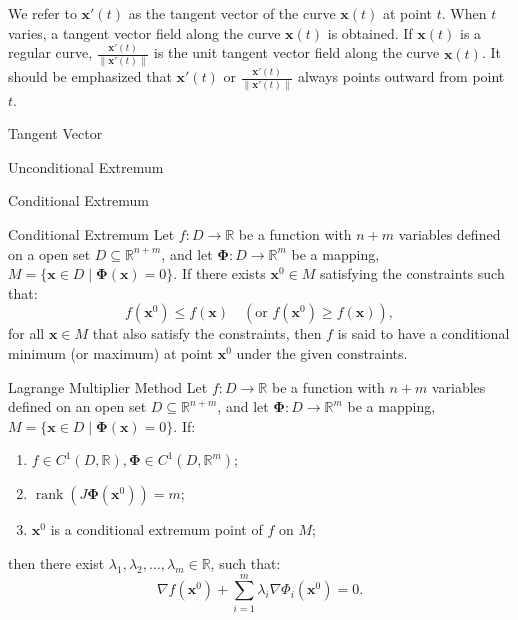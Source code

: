 \documentclass[11pt]{../../TexTemplate/elegantbook}
\begin{document}
We refer to \( \mathbf{x}'(t) \) as the tangent vector of the curve \( \mathbf{x}(t) \) at point \( t \). 
When \( t \) varies, a tangent vector field along the curve \( \mathbf{x}(t) \) is obtained. 
If \( \mathbf{x}(t) \) is a regular curve, 
\( \frac{\mathbf{x}'(t)}{\|\mathbf{x}'(t)\|} \) is the unit tangent vector field along the curve \( \mathbf{x}(t) \). 
It should be emphasized that \( \mathbf{x}'(t) \) or \( \frac{\mathbf{x}'(t)}{\|\mathbf{x}'(t)\|} \) 
always points outward from point \( t \).

\begin{definition}{Tangent Vector}
\end{definition}

\begin{leftbarTitle}{Unconditional Extremum}\end{leftbarTitle}

\begin{leftbarTitle}{Conditional Extremum}\end{leftbarTitle}
\begin{definition}{Conditional Extremum}
    Let \( f: D \to \mathbb{R} \) be a function with \(n+m\) variables defined on a open set \( D \subseteq \mathbb{R}^{n+m} \), 
    and let \(\mathbf{\Phi}: D \to \mathbb{R}^m\) be a mapping, \( M=\{ \mathbf{x} \in D \mid \mathbf{\Phi}(\mathbf{x}) = 0 \} \).
    If there exists \( \mathbf{x}^0 \in M \) satisfying the constraints such that:  
    \[
    f(\mathbf{x}^0) \leq f(\mathbf{x}) \quad (\text{or } f(\mathbf{x}^0) \geq f(\mathbf{x})),
    \]
    for all \( \mathbf{x} \in M \) that also satisfy the constraints, 
    then \( f \) is said to have a conditional minimum (or maximum) at point \( \mathbf{x}^0 \) under the given constraints.
\end{definition}

\begin{theorem}{Lagrange Multiplier Method}
    Let \( f: D \to \mathbb{R} \) be a function with \( n+m \) variables defined on an open set \( D \subseteq \mathbb{R}^{n+m} \), 
    and let \( \mathbf{\Phi}: D \to \mathbb{R}^m \) be a mapping, 
    \( M = \{ \mathbf{x} \in D \mid \mathbf{\Phi}(\mathbf{x}) = 0 \} \). 
    If:
    \begin{enumerate}
        \item \(f \in C^1(D,\mathbb{R}), \mathbf{\Phi} \in C^1(D,\mathbb{R}^m)\);
        \item \(\operatorname{rank}(J\mathbf{\Phi}(\mathbf{x}^0)) = m\);
        \item \(\mathbf{x}^{0}\) is a conditional extremum point of \(f\) on \(M\);
    \end{enumerate}
    then there exist \(\lambda_1, \lambda_2, \dots, \lambda_m \in \mathbb{R}\), such that:
    \[
    \nabla f(\mathbf{x}^0) + \sum_{i=1}^m \lambda_i \nabla \Phi_i(\mathbf{x}^0) = 0.
    \]
\end{theorem}
\end{document}
